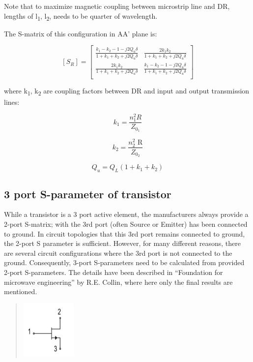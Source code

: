 Note that to maximize magnetic coupling between microstrip line and DR,
lengths of l\textsubscript{1}, l\textsubscript{2}, needs to be quarter
of wavelength.

The S-matrix of this configuration in AA' plane is:

\[\left\lbrack S_{R} \right\rbrack = \begin{bmatrix}
\frac{k_{1} - k_{2} - 1 - j2Q_{u}\delta}{1 + k_{1} + k_{2} + j2Q_{u}\delta} & \frac{2k_{1}k_{2}}{1 + k_{1} + k_{2} + j2Q_{u}\delta} \\
\frac{2k_{1}k_{2}}{1 + k_{1} + k_{2} + j2Q_{u}\delta} & \frac{k_{1} - k_{2} - 1 - j2Q_{u}\delta}{1 + k_{1} + k_{2} + j2Q_{u}\delta} \\
\end{bmatrix}\]

where k\textsubscript{1}, k\textsubscript{2} are coupling factors
between DR and input and output transmission lines:

\[k_{1} = \frac{n_{1}^{2}R}{Z_{0_{1}}}\]

\[k_{2} = \frac{n_{2}^{2}\text{\ R}}{Z_{0_{2}}}\]

\[Q_{u} = Q_{L}(1 + k_{1} + k_{2})\]

\hypertarget{port-s-parameter-of-transistor}{%
\subsection{3 port S-parameter of
transistor}\label{port-s-parameter-of-transistor}}

While a transistor is a 3 port active element, the manufacturers always
provide a 2-port S-matrix; with the 3rd port (often Source or Emitter)
has been connected to ground. In circuit topologies that this 3rd port
remains connected to ground, the 2-port S parameter is sufficient.
However, for many different reasons, there are several circuit
configurations where the 3rd port is not connected to the ground.
Consequently, 3-port S-parameters need to be calculated from provided
2-port S-parameters. The details have been described in ``Foundation for
microwave engineering'' by R.E. Collin, where here only the final
results are mentioned.

\begin{quote}
\includegraphics[width=1.0625in,height=1.10972in]{media/image7.png}
\end{quote}


